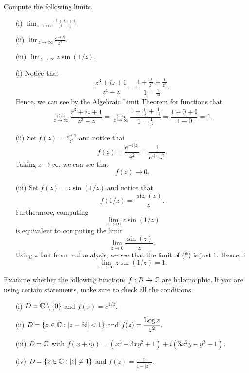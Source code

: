 \documentclass[a4paper]{article}
\begin{document}
\begin{problem}
    Compute the following limits.
    \begin{enumerate}
        \item[(i)] \( \displaystyle \lim_{ z \to \infty  }  \displaystyle \frac{ z^{3} + iz  + 1  }{ z^{3} - z  }  \)
        \item[(ii)] \( \displaystyle \lim_{ z \to \infty  }  \displaystyle \frac{ e^{-i | z | } }{ z^{2} }  \).
        \item[(iii)] \( \displaystyle \lim_{ z \to \infty  } z \sin (1 /z)  \).      
    \end{enumerate}
\end{problem}

\begin{solution}
\begin{enumerate}
    \item[(i)] Notice that 
        \[  \frac{ z^{3} + iz + 1  }{ z^{3} - z  }  = \frac{ 1 + \frac{ i }{ z^{2} }  + \frac{ 1 }{ z^{3} }  }{ 1 - \frac{ 1 }{ z^{2} }  }. \]
        Hence, we can see by the Algebraic Limit Theorem for functions that 
        \[  \lim_{ z \to \infty  } \frac{ z^{3} + iz + 1 }{ z^{3} - z  }  = \lim_{ z \to \infty  }   \frac{ 1 + \frac{ i }{ z^{2} }  + \frac{ 1 }{ z^{3} }  }{ 1 - \frac{ 1 }{ z^{2} }  } = \frac{ 1 + 0 + 0  }{ 1 - 0 } = 1. \]
    \item[(ii)] Set \( f(z) = \frac{ e^{-i | z | } }{ z^{2} }  \) and notice that 
        \[  f(z) = \frac{ e^{-i | z | } }{ z^{2} } = \frac{ 1 }{ e^{i | z | } z^{2} }.  \]
        Taking \( z \to \infty   \), we can see that 
        \[  f(z) \to 0. \]
    \item[(iii)] Set \( f(z) = z \sin (1/z) \) and notice that 
        \[  f(1/z) = \frac{ \sin (z) }{ z }. \]
        Furthermore, computing
        \[  \lim_{ z \to \infty   } z \sin (1/z)  \]
        is equivalent to computing the limit
        \[  \lim_{ z \to 0 }  \frac{ \sin (z) }{ z }. \tag{*} \]
        Using a fact from real analysis, we see that the limit of (*) is just \( 1  \). Hence,  
        i\[  \lim_{ z \to \infty  }  z \sin (1/z) = 1. \]
\end{enumerate}
\end{solution}

\begin{problem}
   Examine whether the following functions \( f: D \to \mathbb{C}  \) are holomorphic. If you are using certain statements, make sure to check all the conditions.
   \begin{enumerate}
       \item[(i)] \( D = \mathbb{C} \setminus  \{ 0 \}  \) and \( f(z) = e^{1/ \overline{z}} \).
        \item[(ii)] \( D = \{ z \in \mathbb{C} : | z - 5i |  < 1 \}   \) and \( f(z) = \displaystyle \frac{ \operatorname{Log} z }{ z^{2} }  \).
        \item[(iii)] \( D = \mathbb{C}  \) with \( f(x  + iy) = (x^{3} - 3x y^{2} + 1) + i (3 x^{2} y - y^{3} - 1). \)
        \item[(iv)] \( D = \{ z \in \mathbb{C} : | z  |  \neq 1  \}  \) and \( f(z) = \displaystyle \frac{ 1 }{ 1 - | z |^{2} } \).
   \end{enumerate}
\end{problem}
\end{document}
